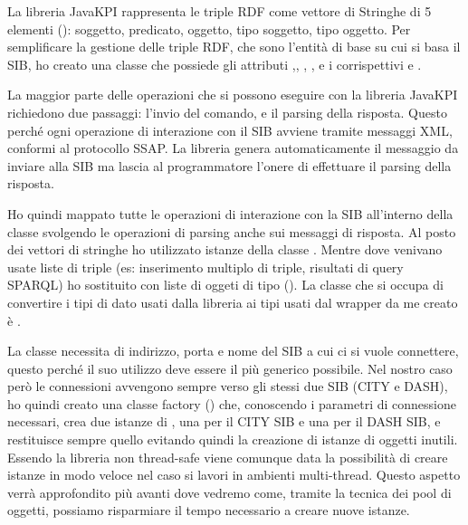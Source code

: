 La libreria JavaKPI rappresenta le triple RDF come vettore di Stringhe di 5 elementi (): soggetto, predicato, oggetto, tipo soggetto, tipo oggetto. 
Per semplificare la gestione delle triple RDF, che sono l'entità di base su cui si basa il SIB, ho creato una classe  che possiede gli attributi ,, , ,  e i corrispettivi  e .

La maggior parte delle operazioni che si possono eseguire con la libreria JavaKPI richiedono due passaggi: l'invio del comando, e il parsing della risposta. Questo perché ogni operazione di interazione con il SIB avviene tramite messaggi XML, conformi al protocollo SSAP. La libreria genera automaticamente il messaggio da inviare alla SIB ma lascia al programmatore l'onere di effettuare il parsing della risposta. 

Ho quindi mappato tutte le operazioni di interazione con la SIB all'interno della classe  svolgendo le operazioni di parsing anche sui messaggi di risposta. Al posto dei vettori di stringhe ho utilizzato istanze della classe . Mentre dove venivano usate liste di triple (es: inserimento multiplo di triple, risultati di query SPARQL) ho sostituito con liste di oggeti di tipo  (). La classe che si occupa di convertire i tipi di dato usati dalla libreria  ai tipi usati dal wrapper da me creato è .

La classe  necessita di indirizzo, porta e nome del SIB a cui ci si vuole connettere, questo perché il suo utilizzo deve essere il più generico possibile. Nel nostro caso però le connessioni avvengono sempre verso gli stessi due SIB (CITY e DASH), ho quindi creato una classe factory () che, conoscendo i parametri di connessione necessari, crea due istanze di , una per il CITY SIB e una per il DASH SIB, e restituisce sempre quello evitando quindi la creazione di istanze di oggetti inutili. Essendo la libreria  non thread-safe viene comunque data la possibilità di creare istanze in modo veloce nel caso si lavori in ambienti multi-thread. Questo aspetto verrà approfondito più avanti dove vedremo come, tramite la tecnica dei pool di oggetti, possiamo risparmiare il tempo necessario a creare nuove istanze.


